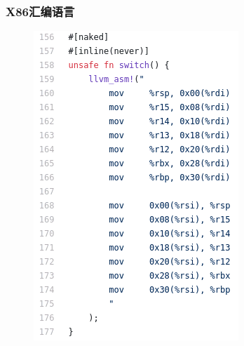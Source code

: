 \begin{frame}[fragile]
    \frametitle{X86汇编语言}
% 
	\begin{figure}
		\centering
		\includegraphics[width=0.34\linewidth]{figs/green-thread-switch.png}
	\end{figure}


% 
\end{frame}
